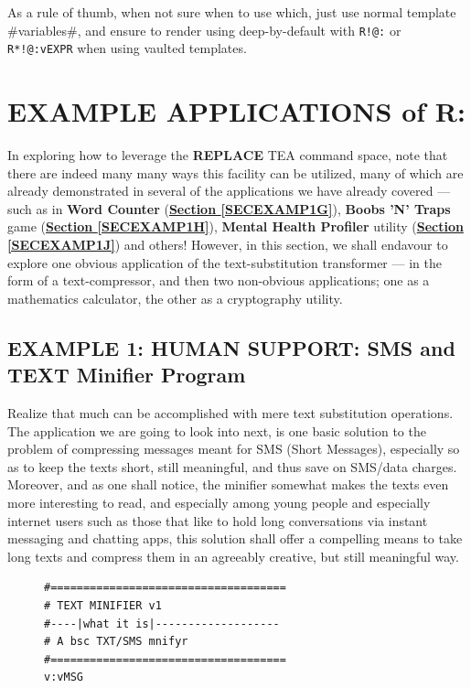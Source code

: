 \documentclass[a4paper, 18pt]{book} %
\begin{document}
{{{\vspace{1em}

As a rule of thumb, when not sure when to use which, just use normal template \#variables\#, and ensure to render using deep-by-default with \texttt{R!@:} or \texttt{R*!@:vEXPR} when using vaulted templates.
 
  
\section{EXAMPLE APPLICATIONS of R:}
\label{SECEXAMPR}

  
In exploring how to leverage the \textbf{REPLACE} TEA command space, note that there are indeed many many ways this facility can be utilized, many of which are already demonstrated in several of the applications we have already covered --- such as in \textbf{Word Counter} (\textbf{\hyperref[SECEXAMP1G]{Section \ref{SECEXAMP1G}}}), \textbf{Boobs 'N' Traps} game (\textbf{\hyperref[SECEXAMP1H]{Section \ref{SECEXAMP1H}}}), \textbf{Mental Health Profiler} utility (\textbf{\hyperref[SECEXAMP1J]{Section \ref{SECEXAMP1J}}}) and others! However, in this section, we shall endavour to explore one obvious application of the text-substitution transformer --- in the form of a text-compressor, and then two non-obvious applications; one as a mathematics calculator, the other as a cryptography utility.


\subsection{EXAMPLE 1: \textbf{HUMAN SUPPORT:} SMS and TEXT Minifier Program }
\label{SECEXAMP1R}


Realize that much can be accomplished with mere text substitution operations. The application we are going to look into next, is one basic solution to the problem of compressing messages meant for SMS (Short Messages), especially so as to keep the texts short, still meaningful, and thus save on SMS/data charges. Moreover, and as one shall notice, the minifier somewhat makes the texts even more interesting to read, and especially among young people and especially internet users such as those that like to hold long conversations via instant messaging and chatting apps, this solution shall offer a compelling means to take long texts and compress them in an agreeably creative, but still meaningful way.

\vspace{2em}


 \begin{figure}[H]
 \Large
  \begin{tcolorbox}[teaterminalstyle, title=TEA Program:  TEXT MINIFIER v1]
    \begin{lstlisting}[language=TEA,breaklines=true,]
#====================================
# TEXT MINIFIER v1
#----|what it is|-------------------
# A bsc TXT/SMS mnifyr
#====================================
v:vMSG


\end{lstlisting}
\end{tcolorbox}
\end{figure}}}}
\end{document}
